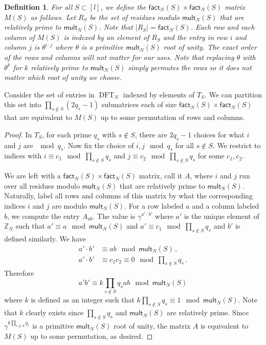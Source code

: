 \documentclass{toc}
\newtheorem{define}[theorem]{Definition}
\renewcommand\Z{{\mathbb{Z}}}
\renewcommand\fact{\textsf{fact}}
\newcommand\mult{\textsf{mult}}
\DeclareMathOperator{\DFT}{DFT}
\begin{document}
\begin{define}\label{def_factormatrix}
For all $S \subset [l]$, we define the $\fact_N(S) \times \fact_N(S)$ matrix $M(S)$ as follows.  Let $R_S$ be the set of residues modulo $ \mult_N(S)$ that are relatively prime to $\mult_N(S)$.  Note that $|R_S| = \fact_N(S)$.  Each row and each column of $M(S)$ is indexed by an element of $R_S$ and the entry in row $i$ and column $j$ is $\theta^{i \cdot j}$ where $\theta$ is a primitive $\mult_N(S)$ root of unity.  The exact order of the rows and columns will not matter for our uses.  Note that replacing $\theta$ with $\theta^k$ for $k$ relatively prime to $\mult_N(S)$ simply permutes the rows so it does not matter which root of unity we choose.
\end{define}


\begin{lemma}\label{division}
Consider the set of entries in %
$\DFT_N$ %
 indexed by elements of $T_S$.  We can partition this set into $\prod_{s \notin S}(2q_s-1)$ submatrices each of size $\fact_N(S) \times \fact_N(S)$ that are equivalent to $M(S)$ up to some permutation of rows and columns.
\end{lemma}
\begin{proof}
In $T_S$, for each prime $q_s$ with $s \notin S$, there are $2q_s - 1$ choices for what $i$ and $j$ are $\mod q_s$.  Now fix the choice of $i,j \mod q_s$ for all $s \notin S$.  
%
We %
restrict to indices with $i \equiv c_1 \mod \prod_{s \notin S}q_s$ and $j \equiv c_2 \mod \prod_{s \notin S}q_s$
%
for some $c_1,c_2$. %
  


We are left with a $\fact_N(S) \times \fact_N(S)$ matrix, call it $A$, where $i$ and $j$ run over all residues modulo $\mult_N(S)$ that are relatively prime to $\mult_N(S)$.  Naturally, label all rows and columns of this matrix by what the corresponding indices $i$ and $j$ are modulo $ \mult_N(S)$.  For a row labeled $a$ and a column labeled $b$, we compute the entry $A_{ab}$.  The value is $\gamma^{a' \cdot b'}$ where $a'$ is the unique element of $\Z_N$ such that $a' \equiv a \mod \mult_N(S)$ and $a' \equiv c_1 \mod  \prod_{s \notin S}q_s$ and $b'$ is defined similarly.  We have
\begin{align*}
  a' \cdot b' &\equiv ab \mod \mult_N(S)\,,\\[1ex]
  a' \cdot b' &\equiv c_1c_2 \equiv 0 \mod \prod_{s \notin S}q_s \,.
\end{align*}
Therefore
\[
a'b' \equiv k\prod_{s \notin S}q_s ab \mod \mult_N(S)
\]
where $k$ is defined as an integer such that $k\prod_{s \notin S}q_s \equiv 1 \mod \mult_N(S)$.  Note that $k$ clearly exists since $\prod_{s \notin S}q_s$ and $\mult_N(S)$ are relatively prime.  Since $\gamma^{k\prod_{s \notin S}q_s}$ is a primitive $\mult_N(S)$ root of unity, the matrix $A$ is equivalent to $M(S)$ up to some permutation, as desired.
\end{proof} 
\end{document}
